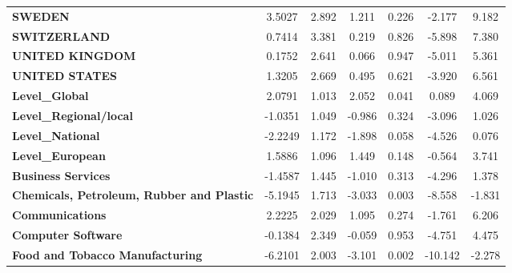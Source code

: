 \documentclass[ 11pt]{article}
\begin{document}
\begin{center}
\begin{tabular}{lcccccc}
\textbf{SWEDEN}                                        &       3.5027  &        2.892     &     1.211  &         0.226        &       -2.177    &        9.182     \\
\textbf{SWITZERLAND}                                   &       0.7414  &        3.381     &     0.219  &         0.826        &       -5.898    &        7.380     \\
\textbf{UNITED KINGDOM}                                &       0.1752  &        2.641     &     0.066  &         0.947        &       -5.011    &        5.361     \\
\textbf{UNITED STATES}                                 &       1.3205  &        2.669     &     0.495  &         0.621        &       -3.920    &        6.561     \\
\textbf{Level\_Global}                                 &       2.0791  &        1.013     &     2.052  &         0.041        &        0.089    &        4.069     \\
\textbf{Level\_Regional/local}                         &      -1.0351  &        1.049     &    -0.986  &         0.324        &       -3.096    &        1.026     \\
\textbf{Level\_National}                               &      -2.2249  &        1.172     &    -1.898  &         0.058        &       -4.526    &        0.076     \\
\textbf{Level\_European}                               &       1.5886  &        1.096     &     1.449  &         0.148        &       -0.564    &        3.741     \\
\textbf{Business Services}                             &      -1.4587  &        1.445     &    -1.010  &         0.313        &       -4.296    &        1.378     \\
\textbf{Chemicals, Petroleum, Rubber and Plastic}      &      -5.1945  &        1.713     &    -3.033  &         0.003        &       -8.558    &       -1.831     \\
\textbf{Communications}                                &       2.2225  &        2.029     &     1.095  &         0.274        &       -1.761    &        6.206     \\
\textbf{Computer Software}                             &      -0.1384  &        2.349     &    -0.059  &         0.953        &       -4.751    &        4.475     \\
\textbf{Food and Tobacco Manufacturing}                &      -6.2101  &        2.003     &    -3.101  &         0.002        &      -10.142    &       -2.278     \\

\end{tabular}
\end{center}
\end{document}

